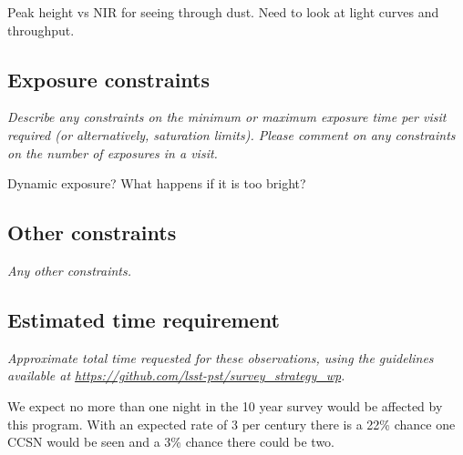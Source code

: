 \documentclass[11pt]{article}
\begin{document}
Peak height vs NIR for seeing through dust. Need to look at light
curves and throughput.

\subsection{Exposure constraints}
\begin{footnotesize}
{\it Describe any constraints on the minimum or maximum exposure time per visit required (or alternatively, saturation limits).
Please comment on any constraints on the number of exposures in a visit.}
\end{footnotesize}

Dynamic exposure? What happens if it is too bright?


\subsection{Other constraints}
\begin{footnotesize}
{\it Any other constraints.}
\end{footnotesize}

\subsection{Estimated time requirement}
\begin{footnotesize}
{\it Approximate total time requested for these observations, using the guidelines available at \url{https://github.com/lsst-pst/survey_strategy_wp}.}
\end{footnotesize}

We expect no more than one night in the 10 year survey would be
affected by this program. With an expected rate of 3 per century there
is a 22\% chance one CCSN would be seen and a 3\% chance there could
be two.

\vspace{.3in}
\end{document}
